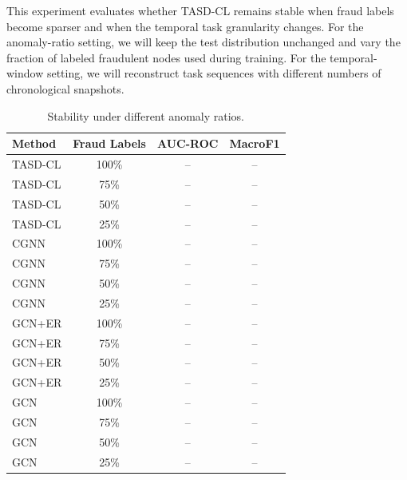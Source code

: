 This experiment evaluates whether TASD-CL remains stable when fraud labels become sparser and when the temporal task granularity changes. For the anomaly-ratio setting, we will keep the test distribution unchanged and vary the fraction of labeled fraudulent nodes used during training. For the temporal-window setting, we will reconstruct task sequences with different numbers of chronological snapshots.


\begin{table}[!htbp]
  \centering
  \caption{Stability under different anomaly ratios.}
  \label{tab:anomaly-ratio}
  \scriptsize
  \setlength{\tabcolsep}{3pt}
  \begin{tabular*}{\columnwidth}{@{\extracolsep{\fill}}lccc@{}}
    \toprule
    Method & Fraud Labels & AUC-ROC & MacroF1 \\
    \midrule
    TASD-CL & 100\% & -- & -- \\
    TASD-CL & 75\% & -- & -- \\
    TASD-CL & 50\% & -- & -- \\
    TASD-CL & 25\% & -- & -- \\
    \midrule
    CGNN & 100\% & -- & -- \\
    CGNN & 75\% & -- & -- \\
    CGNN & 50\% & -- & -- \\
    CGNN & 25\% & -- & -- \\
    \midrule
    GCN+ER & 100\% & -- & -- \\
    GCN+ER & 75\% & -- & -- \\
    GCN+ER & 50\% & -- & -- \\
    GCN+ER & 25\% & -- & -- \\
    \midrule
    GCN & 100\% & -- & -- \\
    GCN & 75\% & -- & -- \\
    GCN & 50\% & -- & -- \\
    GCN & 25\% & -- & -- \\
    \bottomrule
  \end{tabular*}
\end{table}

